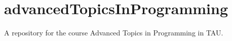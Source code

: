 \chapter{advanced\+Topics\+In\+Programming}
\hypertarget{md__r_e_a_d_m_e}{}\label{md__r_e_a_d_m_e}
\label{md__r_e_a_d_m_e_autotoc_md0}%
%


A repository for the course Advanced Topics in Programming in TAU. 